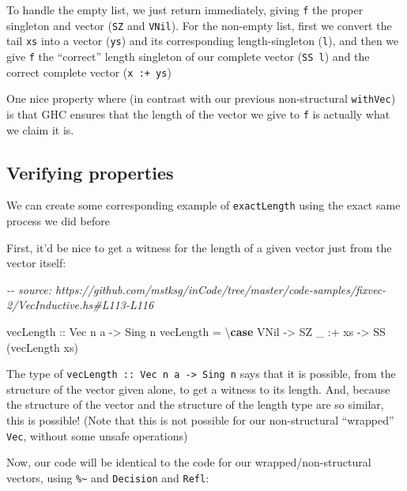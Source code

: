 \documentclass[]{article}
\newenvironment{Shaded}{}{}
\newcommand{\CommentTok}[1]{\textcolor[rgb]{0.38,0.63,0.69}{\textit{#1}}}
\newcommand{\DataTypeTok}[1]{\textcolor[rgb]{0.56,0.13,0.00}{#1}}
\newcommand{\KeywordTok}[1]{\textcolor[rgb]{0.00,0.44,0.13}{\textbf{#1}}}
\newcommand{\NormalTok}[1]{#1}
\newcommand{\OperatorTok}[1]{\textcolor[rgb]{0.40,0.40,0.40}{#1}}
\newcommand{\OtherTok}[1]{\textcolor[rgb]{0.00,0.44,0.13}{#1}}
\begin{document}
To handle the empty list, we just return immediately, giving \texttt{f} the
proper singleton and vector (\texttt{SZ} and \texttt{VNil}). For the non-empty
list, first we convert the tail \texttt{xs} into a vector (\texttt{ys}) and its
corresponding length-singleton (\texttt{l}), and then we give \texttt{f} the
``correct'' length singleton of our complete vector (\texttt{SS\ l}) and the
correct complete vector (\texttt{x\ :+\ ys})

One nice property where (in contrast with our previous non-structural
\texttt{withVec}) is that GHC ensures that the length of the vector we give to
\texttt{f} is actually what we claim it is.

\subsection{Verifying properties}\label{verifying-properties-1}

We can create some corresponding example of \texttt{exactLength} using the exact
same process we did before

First, it'd be nice to get a witness for the length of a given vector just from
the vector itself:

\begin{Shaded}
\begin{Highlighting}[]
\CommentTok{{-}{-} source: https://github.com/mstksg/inCode/tree/master/code{-}samples/fixvec{-}2/VecInductive.hs\#L113{-}L116}

\OtherTok{vecLength ::} \DataTypeTok{Vec}\NormalTok{ n a }\OtherTok{{-}\textgreater{}} \DataTypeTok{Sing}\NormalTok{ n}
\NormalTok{vecLength }\OtherTok{=}\NormalTok{ \textbackslash{}}\KeywordTok{case}
    \DataTypeTok{VNil}    \OtherTok{{-}\textgreater{}} \DataTypeTok{SZ}
\NormalTok{    \_ }\OperatorTok{:+}\NormalTok{ xs }\OtherTok{{-}\textgreater{}} \DataTypeTok{SS}\NormalTok{ (vecLength xs)}
\end{Highlighting}
\end{Shaded}

The type of \texttt{vecLength\ ::\ Vec\ n\ a\ -\textgreater{}\ Sing\ n} says
that it is possible, from the structure of the vector given alone, to get a
witness to its length. And, because the structure of the vector and the
structure of the length type are so similar, this is possible! (Note that this
is not possible for our non-structural ``wrapped'' \texttt{Vec}, without some
unsafe operations)

Now, our code will be identical to the code for our wrapped/non-structural
vectors, using \texttt{\%\textasciitilde{}} and \texttt{Decision} and
\texttt{Refl}:
\end{document}
